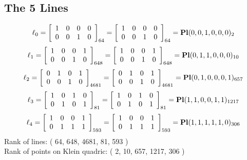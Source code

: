 \documentclass{article}
\begin{document}
{\subsection*{The 5 Lines}
$$
\ell_{0} = 
\left[
\begin{array}{*{4}{r}}
1 & 0 & 0 & 0\\
0 & 0 & 1 & 0\\
\end{array}
\right]
_{64}
=
\left[
\begin{array}{*{4}c}
1  & 0  & 0  & 0\\
0  & 0  & 1  & 0\\
\end{array}
\right]_{64}
={\rm\bf Pl}(0,0,1,0,0,0 )_{2}$$
$$
\ell_{1} = 
\left[
\begin{array}{*{4}{r}}
1 & 0 & 0 & 1\\
0 & 0 & 1 & 0\\
\end{array}
\right]
_{648}
=
\left[
\begin{array}{*{4}c}
1  & 0  & 0  & 1\\
0  & 0  & 1  & 0\\
\end{array}
\right]_{648}
={\rm\bf Pl}(0,1,1,0,0,0 )_{10}$$
$$
\ell_{2} = 
\left[
\begin{array}{*{4}{r}}
0 & 1 & 0 & 1\\
0 & 0 & 1 & 0\\
\end{array}
\right]
_{4681}
=
\left[
\begin{array}{*{4}c}
0  & 1  & 0  & 1\\
0  & 0  & 1  & 0\\
\end{array}
\right]_{4681}
={\rm\bf Pl}(0,1,0,0,0,1 )_{657}$$
$$
\ell_{3} = 
\left[
\begin{array}{*{4}{r}}
1 & 0 & 1 & 0\\
0 & 1 & 0 & 1\\
\end{array}
\right]
_{81}
=
\left[
\begin{array}{*{4}c}
1  & 0  & 1  & 0\\
0  & 1  & 0  & 1\\
\end{array}
\right]_{81}
={\rm\bf Pl}(1,1,0,0,1,1 )_{1217}$$
$$
\ell_{4} = 
\left[
\begin{array}{*{4}{r}}
1 & 0 & 0 & 1\\
0 & 1 & 1 & 1\\
\end{array}
\right]
_{593}
=
\left[
\begin{array}{*{4}c}
1  & 0  & 0  & 1\\
0  & 1  & 1  & 1\\
\end{array}
\right]_{593}
={\rm\bf Pl}(1,1,1,1,1,0 )_{306}$$
Rank of lines: ( 64, 648, 4681, 81, 593 )\\
Rank of points on Klein quadric: ( 2, 10, 657, 1217, 306 )\\
}
\end{document}

